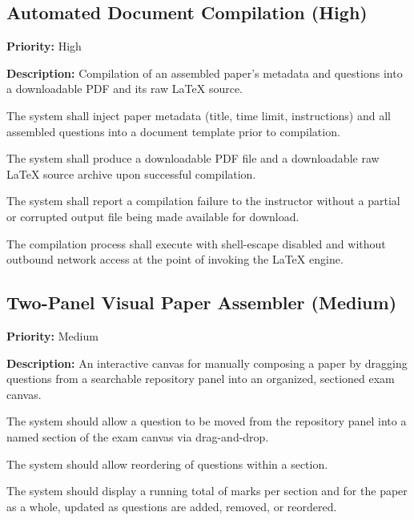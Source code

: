 \documentclass[11pt]{article}
\newcommand{\priority}[1]{\textbf{Priority:} #1}
\newcommand{\reqid}[1]{\textbf{#1}}
\begin{document}
\subsection{Automated Document Compilation (High)}
\priority{High}

\textbf{Description:} Compilation of an assembled paper's metadata and
questions into a downloadable PDF and its raw LaTeX source.

\begin{description}[nosep,leftmargin=2.2cm]
  \item[\reqid{REQ-7.1}] The system shall inject paper metadata (title,
    time limit, instructions) and all assembled questions into a document
    template prior to compilation.
  \item[\reqid{REQ-7.2}] The system shall produce a downloadable PDF file
    and a downloadable raw LaTeX source archive upon successful compilation.
  \item[\reqid{REQ-7.3}] The system shall report a compilation failure to
    the instructor without a partial or corrupted output file being made
    available for download.
  \item[\reqid{REQ-7.4}] The compilation process shall execute with
    shell-escape disabled and without outbound network access at the point
    of invoking the LaTeX engine.
\end{description}

\subsection{Two-Panel Visual Paper Assembler (Medium)}
\priority{Medium}

\textbf{Description:} An interactive canvas for manually composing a paper
by dragging questions from a searchable repository panel into an
organized, sectioned exam canvas.

\begin{description}[nosep,leftmargin=2.2cm]
  \item[\reqid{REQ-8.1}] The system should allow a question to be moved
    from the repository panel into a named section of the exam canvas via
    drag-and-drop.
  \item[\reqid{REQ-8.2}] The system should allow reordering of questions
    within a section.
  \item[\reqid{REQ-8.3}] The system should display a running total of
    marks per section and for the paper as a whole, updated as questions
    are added, removed, or reordered.
\end{description}
\end{document}
